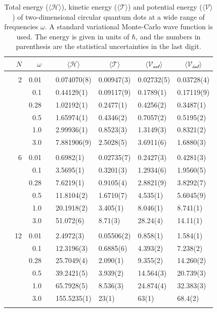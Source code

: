 \iffalse
\begin{table}
	\caption{Total energy ($\langle\mathcal{H}\rangle$), kinetic energy ($\langle\mathcal{T}\rangle$) and potential energy ($\langle\mathcal{V}\rangle$) of two-dimensional circular quantum dots at a wide range of frequencies $\omega$. A standard variational Monte-Carlo wave function is used. The energy is given in units of $\hbar$, and the numbers in parenthesis are the statistical uncertainties in the last digit.}
	\label{tab:splitfrequencyQDVMC}
	\begin{tabularx}{\textwidth}{R{1.5cm}rrcR{2.3cm}R{2.3cm}R{2.3cm}R{2.3cm}} \hline\hline
		& & $\omega$ &&  &  &  &  \\ \hline \\
		&2 & 0.01 && 0.074070(8) & 0.00947(3) & 0.02732(5) & 0.03728(4) \\
		&& 0.1 && 0.44129(1) & 0.09117(9) & 0.1789(1) & 0.17119(9) \\
		&& 0.28 && 1.02192(1) & 0.2477(1) & 0.4256(2) & 0.3487(1) \\
		&& 0.5 && 1.65974(1) & 0.4346(2) & 0.7057(2) & 0.5195(2)\\
		&& 1.0 && 2.99936(1) & 0.8523(3) & 1.3149(3) & 0.8321(2)\\
		&& 3.0 && 7.881906(9) & 2.5028(5) & 3.6911(6) & 1.6880(3) \\ \hdashline \\
		
		&6 & 0.01 && 0.6982(1) & 0.02735(7) & 0.2427(3) & 0.4281(3) \\
		&& 0.1 && 3.5695(1) & 0.3201(3) & 1.2934(6) & 1.9560(5) \\
		&& 0.28 && 7.6219(1) & 0.9105(4) & 2.8821(9) & 3.8292(7) \\
		&& 0.5 && 11.8104(2) & 1.6710(7) & 4.535(1) & 5.6045(9)\\
		&& 1.0 && 20.1918(2) & 3.405(1) & 8.046(1) & 8.741(1)\\
		&& 3.0 && 51.072(6) & 8.71(3) & 28.24(4) & 14.11(1) \\ \hdashline \\
		
		&12 & 0.01 && 2.4972(3) & 0.05506(2) & 0.858(1) & 1.584(1)\\
		&& 0.1 && 12.3196(3) & 0.6885(6) & 4.393(2) & 7.238(2) \\
		&& 0.28 && 25.7049(4) & 2.090(1) & 9.355(2) & 14.260(2) \\
		&& 0.5 && 39.2421(5) & 3.939(2) & 14.564(3) & 20.739(3) \\
		&& 1.0 && 65.7928(5) & 8.536(3) & 24.874(4) & 32.383(3) \\
		&& 3.0 && 155.5235(1) & 23(1) & 63(1) & 68.4(2) \\ \hdashline \\
		

\end{tabularx}
\end{table}
